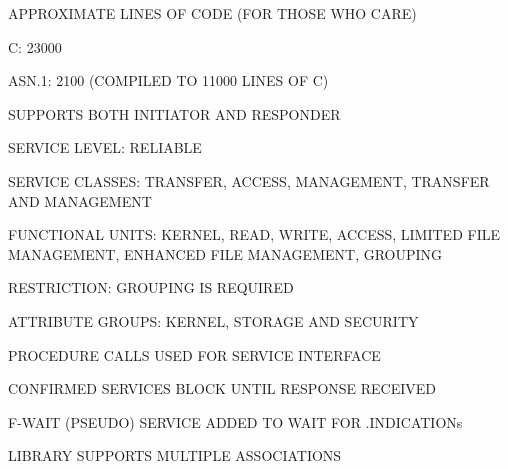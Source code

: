 \begin{bwslide}

\begin{nrtc}
\item	APPROXIMATE LINES OF CODE (FOR THOSE WHO CARE)
    \begin{nrtc}
    \item	C: 23000

    \item	ASN.1: 2100 (COMPILED TO 11000 LINES OF C)
    \end{nrtc}

\item	SUPPORTS BOTH INITIATOR AND RESPONDER

\item	SERVICE LEVEL: RELIABLE

\item	SERVICE CLASSES: TRANSFER, ACCESS, MANAGEMENT, TRANSFER AND MANAGEMENT

\item	FUNCTIONAL UNITS: KERNEL, READ, WRITE, ACCESS, LIMITED FILE MANAGEMENT,
	ENHANCED FILE MANAGEMENT, GROUPING
    \begin{nrtc}
    \item	RESTRICTION: GROUPING IS REQUIRED
    \end{nrtc}

\item	ATTRIBUTE GROUPS: KERNEL, STORAGE AND SECURITY
\end{nrtc}
\end{bwslide}


\begin{bwslide}

\begin{nrtc}
\item	PROCEDURE CALLS USED FOR SERVICE INTERFACE
    \begin{nrtc}
    \item	CONFIRMED SERVICES BLOCK UNTIL RESPONSE RECEIVED

    \item	F-WAIT (PSEUDO) SERVICE ADDED TO WAIT FOR .INDICATIONs
    \end{nrtc}

\item	LIBRARY SUPPORTS MULTIPLE ASSOCIATIONS
\end{nrtc}
\end{bwslide}



